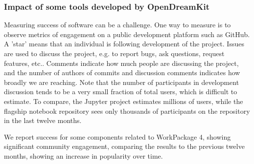 \subsubsection{Impact of some tools developed by OpenDreamKit}



Measuring success of software can be a challenge.
One way to measure is to observe metrics of engagement on
a public development platform such as GitHub.
A 'star' means that an individual is following development of the project.
Issues are used to discuss the project, e.g. to report bugs, ask questions, request features, etc..
Comments indicate how much people are discussing the project,
and the number of authors of commits and discussion comments indicates
how broadly we are reaching.
Note that the number of participants in development discussion tends to be a very small fraction of total users,
which is difficult to estimate.
To compare, the Jupyter project estimates millions of users,
while the flagship notebook repository sees only thousands of participants on the repository in the last twelve months.

We report success for some \ODK components related to WorkPackage 4,
showing significant community engagement,
comparing the results to the previous twelve months,
showing an increase in popularity over time.

